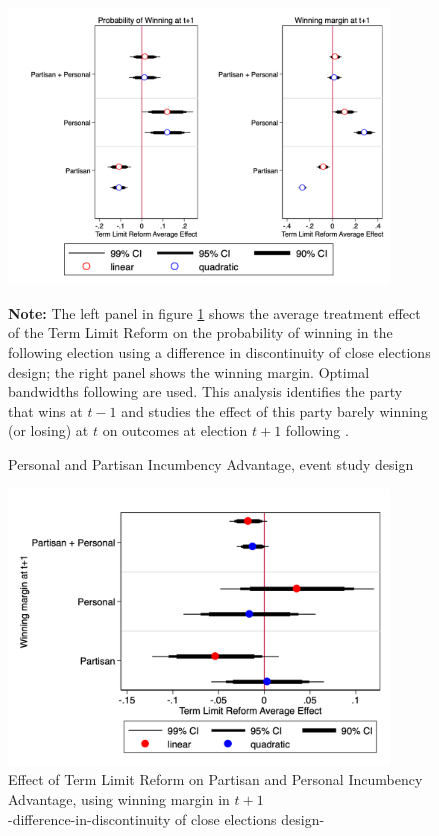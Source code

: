 \documentclass[12pt]{amsart}
\numberwithin{equation}{section}
\theoremstyle{definition}
\theoremstyle{definition}
\theoremstyle{definition}
\begin{document}
\begin{appendix}
 \begin{figure}[h]   
\centering
 \caption{Personal and Partisan Incumbency Advantage, event study design}
 \label{fig:naive_partisan&personal}
 \includegraphics[width=0.9\textwidth]{../Figures_incumbency/naive_personalvspartisan_advantage.png}
 
  \textbf{Note:} The left panel in figure \ref{fig:naive_partisan&personal} shows the average treatment effect of the Term Limit Reform on the probability of winning in the following election using a difference in discontinuity of close elections design; the right panel shows the winning margin. Optimal bandwidths following \citet{calonicoetal_2014} are used. This analysis identifies the party that wins at $t-1$ and studies the effect of this party barely winning (or losing) at $t$ on outcomes at election $t+1$ following \citet{klasnja_titiunik_2017}.  
\end{figure} 
       
\begin{figure}[h]   
\centering    
 \caption{Effect of Term Limit Reform on Partisan and Personal Incumbency Advantage, using winning margin in $t+1$ \\ -difference-in-discontinuity of close elections design-}
 \label{fig:personal_vs_partisan}
\includegraphics[width=0.9\textwidth]{../Figures_incumbency/partisan_personal_inc_advantage_margin.png}
       \captionsetup{justification=centering}
       

\end{figure}
\end{appendix}
\end{document}
